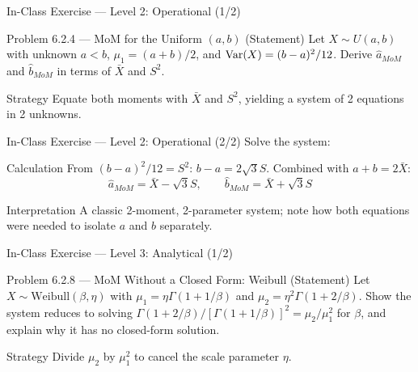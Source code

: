 \documentclass[aspectratio=169,xcolor={dvipsnames,table}]{beamer}
\begin{document}
\begin{frame}{In-Class Exercise --- Level 2: Operational (1/2)}
	\vspace{-0.1cm}
	\begin{block}{Problem 6.2.4 --- MoM for the Uniform $(a,b)$ (Statement)}
		Let $X\sim U(a,b)$ with unknown $a<b$, $\mu_1=(a+b)/2$, and $\operatorname{Var}(X)=(b-a)^2/12$. Derive $\hat a_{MoM}$ and $\hat b_{MoM}$ in terms of $\bar X$ and $S^2$.
	\end{block}
	\vspace{0.15cm}
	\pause
	\begin{alertblock}{Strategy}
		\scriptsize
		Equate both moments with $\bar X$ and $S^2$, yielding a system of 2 equations in 2 unknowns.
	\end{alertblock}
\end{frame}

\begin{frame}{In-Class Exercise --- Level 2: Operational (2/2)}
	\vspace{-0.05cm}
	\scriptsize
	Solve the system: \pause
	\begin{block}{Calculation}
		From $(b-a)^2/12=S^2$: $b-a=2\sqrt{3}S$. Combined with $a+b=2\bar X$:
		$$\hat a_{MoM} = \bar X - \sqrt{3}S, \qquad \hat b_{MoM} = \bar X + \sqrt{3}S$$
	\end{block}
	\vspace{0.05cm}
	\pause
	\begin{alertblock}{Interpretation}
		\scriptsize
		A classic 2-moment, 2-parameter system; note how both equations were needed to isolate $a$ and $b$ separately.
	\end{alertblock}
\end{frame}

\begin{frame}{In-Class Exercise --- Level 3: Analytical (1/2)}
	\vspace{-0.1cm}
	\begin{block}{Problem 6.2.8 --- MoM Without a Closed Form: Weibull (Statement)}
		Let $X\sim\text{Weibull}(\beta,\eta)$ with $\mu_1=\eta\Gamma(1+1/\beta)$ and $\mu_2=\eta^2\Gamma(1+2/\beta)$. Show the system reduces to solving $\Gamma(1+2/\beta)/[\Gamma(1+1/\beta)]^2=\mu_2/\mu_1^2$ for $\beta$, and explain why it has no closed-form solution.
	\end{block}
	\vspace{0.1cm}
	\pause
	\begin{alertblock}{Strategy}
		\scriptsize
		Divide $\mu_2$ by $\mu_1^2$ to cancel the scale parameter $\eta$.
	\end{alertblock}
\end{frame}
\end{document}
